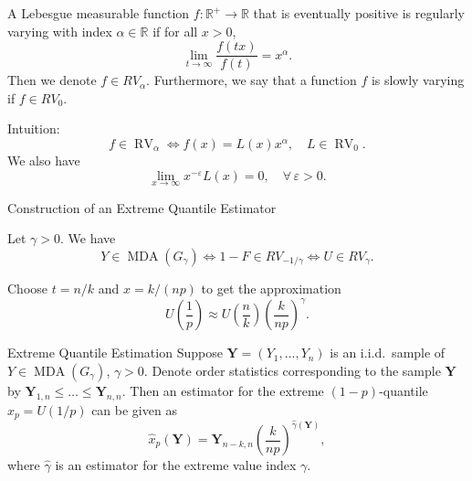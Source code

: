 \documentclass[11pt, aspectratio=169]{beamer}
\DeclareMathOperator{\mda}{MDA}
\DeclareMathOperator{\rv}{RV}
\begin{document}

\begin{frame}
  \begin{definition}
    A Lebesgue measurable function $f:\mathbb{R}^+\to\mathbb{R}$ that is
    eventually positive is regularly varying with index $\alpha\in\mathbb{R}$ if
    for all $x > 0$,
    \begin{equation*}
      \lim_{t\to\infty}\frac{f\left(tx\right)}{f\left(t\right)} = x^\alpha.
    \end{equation*}
    Then we denote $f\in RV_\alpha$. Furthermore, we say that a function $f$ is
    slowly varying if $f\in RV_0$.
  \end{definition}
  \pause
  Intuition:
  \begin{equation*}
    f\in\rv_\alpha \iff f(x) = L(x)x^{\alpha}, \quad L\in\rv_0.
  \end{equation*}
  We also have
  \begin{equation*}
    \lim_{x\to\infty} x^{-\varepsilon} L(x) = 0, \quad\forall
    \, \varepsilon > 0.
  \end{equation*}
\end{frame}


\begin{frame}{Construction of an Extreme Quantile Estimator}
  \begin{theorem}
    Let $\gamma > 0$. We have
    \begin{equation*}
      Y\in\mda\left(G_\gamma\right) \iff 1-F\in RV_{-1/\gamma}
      \iff U\in RV_\gamma.
    \end{equation*}
    \pause
  \end{theorem}
  Choose $t=n/k$ and $x = k/(np)$ to get the approximation
    \begin{equation*}
      U\left(\frac{1}{p}\right)\approx U\left(\frac{n}{k}\right)
      \left(\frac{k}{np}\right)^{\gamma}.
    \end{equation*}
\end{frame}


\begin{frame}{Extreme Quantile Estimation}
  Suppose $\bm Y = \left(Y_1, \ldots, Y_n\right)$ is an i.i.d.\ sample of
  $Y\in\mda\left(G_\gamma\right)$, $\gamma > 0$. Denote order statistics
  corresponding to the sample $\bm Y$ by $\bm Y_{1, n} \leq \dots \leq \bm Y_{n,
  n}$. Then an estimator for the extreme $(1-p)$-quantile $x_{p} =
  U\left(1/p\right)$ can be given as
  \begin{equation*}
    \hat x_{p}\left(\bm Y\right) = \bm Y_{n-k,n}
    \left(\frac{k}{np}\right)^{\hat\gamma\left(\bm Y\right)},
  \end{equation*}
  where $\hat\gamma$ is an estimator for the extreme value index $\gamma$.
\end{frame}
\end{document}
